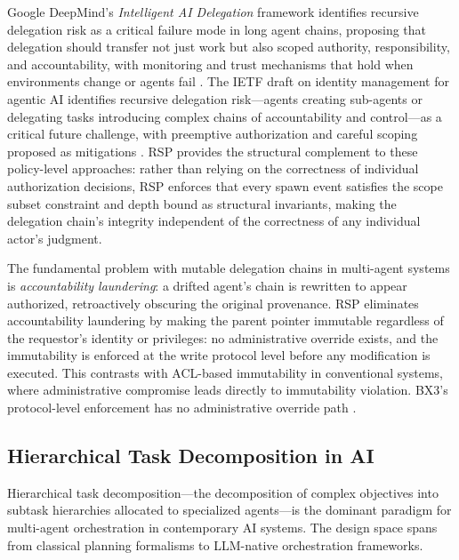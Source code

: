 Google DeepMind's \emph{Intelligent AI Delegation} framework identifies recursive delegation risk as a critical failure mode in long agent chains, proposing that delegation should transfer not just work but also scoped authority, responsibility, and accountability, with monitoring and trust mechanisms that hold when environments change or agents fail \cite{intelligent-delegation}. The IETF draft on identity management for agentic AI identifies recursive delegation risk---agents creating sub-agents or delegating tasks introducing complex chains of accountability and control---as a critical future challenge, with preemptive authorization and careful scoping proposed as mitigations \cite{openid-agentic-ai}. RSP provides the structural complement to these policy-level approaches: rather than relying on the correctness of individual authorization decisions, RSP enforces that every spawn event satisfies the scope subset constraint and depth bound as structural invariants, making the delegation chain's integrity independent of the correctness of any individual actor's judgment.

The fundamental problem with mutable delegation chains in multi-agent systems is \emph{accountability laundering}: a drifted agent's chain is rewritten to appear authorized, retroactively obscuring the original provenance. RSP eliminates accountability laundering by making the parent pointer immutable regardless of the requestor's identity or privileges: no administrative override exists, and the immutability is enforced at the write protocol level before any modification is executed. This contrasts with ACL-based immutability in conventional systems, where administrative compromise leads directly to immutability violation. BX3's protocol-level enforcement has no administrative override path \cite{bx3-framework,bansal2019}.

\subsection{Hierarchical Task Decomposition in AI}

Hierarchical task decomposition---the decomposition of complex objectives into subtask hierarchies allocated to specialized agents---is the dominant paradigm for multi-agent orchestration in contemporary AI systems. The design space spans from classical planning formalisms to LLM-native orchestration frameworks.

